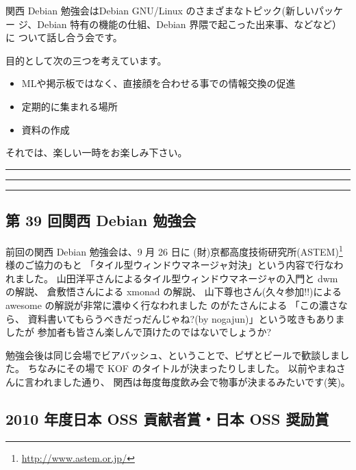 \documentclass[mingoth,a4paper]{jsarticle}
\begin{document}
関西 Debian 勉強会はDebian GNU/Linux のさまざまなトピック(新しいパッケー
ジ、Debian 特有の機能の仕組、Debian 界隈で起こった出来事、などなど）に
ついて話し合う会です。

目的として次の三つを考えています。
\begin{itemize}
      \item MLや掲示板ではなく、直接顔を合わせる事での情報交換の促進
      \item 定期的に集まれる場所
      \item 資料の作成
\end{itemize}

それでは、楽しい一時をお楽しみ下さい。

\clearpage

\begin{minipage}[b]{0.2\hsize}
 {}
\end{minipage}
\begin{minipage}[b]{0.8\hsize}
\hrule
\vspace{2mm}
\hrule
\setcounter{tocdepth}{1}
\tableofcontents
\vspace{2mm}
\hrule
\end{minipage}


\subsection{第 39 回関西 Debian 勉強会}

前回の関西 Debian 勉強会は、9 月 26 日に
(財)京都高度技術研究所(ASTEM)\footnote{\url{http://www.astem.or.jp/}}様のご協力のもと
「タイル型ウィンドウマネージャ対決」という内容で行なわれました。
%
山田洋平さんによるタイル型ウィンドウマネージャの入門と dwm の解説、
倉敷悟さんによる xmonad の解説、
山下尊也さん(久々参加!!)による awesome の解説が非常に濃ゆく行なわれました
のがたさんによる
「この濃さなら、
資料書いてもらうべきだっだんじゃね?(by nogajun)」という呟きもありましたが
%
参加者も皆さん楽しんで頂けたのではないでしょうか?

勉強会後は同じ会場でビアバッシュ、ということで、ピザとビールで歓談しました。
ちなみにその場で KOF のタイトルが決まったりしました。
以前やまねさんに言われました通り、
関西は毎度毎度飲み会で物事が決まるみたいです(笑)。


\subsection{2010 年度日本 OSS 貢献者賞・日本 OSS 奨励賞}
\end{document}
